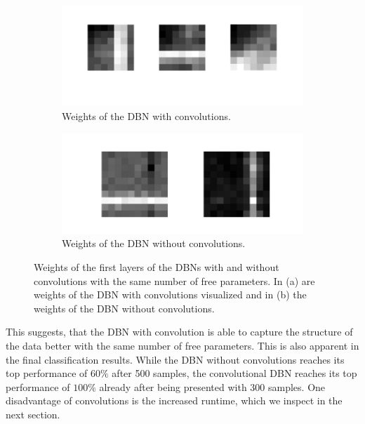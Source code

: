 \begin{figure}[h!]
	\centering
	\begin{subfigure}[t]{.45\textwidth}
  		\centering
  		\includegraphics[width=.9\linewidth]{imgs/cvsnc/wc.png}
  		\caption{Weights of the DBN with convolutions.}
  		\label{fig:sub1}
	\end{subfigure}%
	\begin{subfigure}[t]{.45\textwidth}
  		\centering
  		\includegraphics[width=.9\linewidth]{imgs/cvsnc/wnc.png}
  		\caption{Weights of the DBN without convolutions.}
  		\label{fig:sub2}
	\end{subfigure}
	\caption[Weights of the first layers of the DBNs with and without convolutions with the same number of free parameters.]{Weights of the first layers of the DBNs with and without convolutions with the same number of free parameters. In (a) are weights of the DBN with convolutions visualized and in (b) the weights of the DBN without convolutions.}
	\label{fig:wwoconwconv}
\end{figure}


This suggests, that the DBN with convolution is able to capture the structure of the data better with the same number of free parameters. 
This is also apparent in the final classification results.
While the DBN without convolutions reaches its top performance of $60 \%$ after 500 samples, the convolutional DBN reaches its top performance of $100 \%$ already after being presented with 300 samples.
One disadvantage of convolutions is the increased runtime, which we inspect in the next section.

